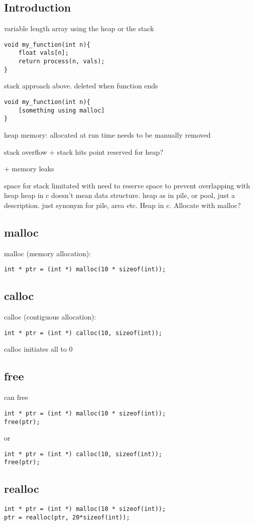 
\subsection{Introduction}

variable length array using the heap or the stack
\begin{verbatim}
void my_function(int n){
    float vals[n];
    return process(n, vals);
}
\end{verbatim}
stack approach above. deleted when function ends

\begin{verbatim}
void my_function(int n){
    [something using malloc]
}
\end{verbatim}

heap memory: allocated at run time
needs to be manually removed

stack overflow
+ stack hits point reserved for heap?

+ memory leaks

space for stack limitated with need to reserve space to prevent overlapping with heap
heap in c doesn't mean data structure. heap as in pile, or pool, just a description. just synonym for pile, area etc.
Heap in c. Allocate with malloc?



\subsection{malloc}
malloc (memory allocation):
\begin{verbatim}
int * ptr = (int *) malloc(10 * sizeof(int));
\end{verbatim}

\subsection{calloc}
calloc (contiguous allocation):
\begin{verbatim}
int * ptr = (int *) calloc(10, sizeof(int));
\end{verbatim}

calloc initiates all to 0

\subsection{free}
can free
\begin{verbatim}
int * ptr = (int *) malloc(10 * sizeof(int));
free(ptr);
\end{verbatim}

or
\begin{verbatim}
int * ptr = (int *) calloc(10, sizeof(int));
free(ptr);
\end{verbatim}


\subsection{realloc}
\begin{verbatim}
int * ptr = (int *) malloc(10 * sizeof(int));
ptr = realloc(ptr, 20*sizeof(int));
\end{verbatim}

